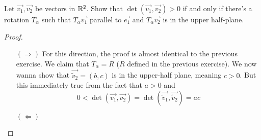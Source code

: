 \begin{exercise}
  Let $\vec{v_1},\vec{v_2}$ be vectors in $\mathbb R^2$. Show that 
  $\det(\vec{v_1},\vec{v_2})>0$ if and only if there's a rotation
  $T_{\alpha}$ such that $T_{\alpha}\vec{v_1}$ parallel to $\vec{e_1}$
  and $T_{\alpha}\vec{v_2}$ is in the upper half-plane.
\end{exercise}
\begin{proof}
  \text{}
  \begin{itemize}
    \item[$(\Rightarrow)$] For this direction, the proof is almost 
      identical to the previous exercise. We claim that 
      $T_{\alpha}=R$ ($R$ defined in the previous exercise).
      We now wanna show that $\vec{\tilde{v}_2}=(b,c)$ is in the 
      upper-half plane, meaning $c>0$. But this immediately true 
      from the fact that $a>0$ and
      \[
        0<\det(\vec{v_1},\vec{v_2})=
        \det(\vec{\tilde{v}_1},\vec{\tilde{v}_2})=ac
      \]
    \item[$(\Leftarrow)$]
  \end{itemize}
\end{proof}






